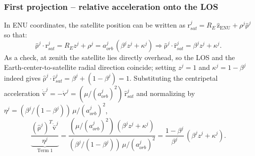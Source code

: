 \documentclass[letterpaper,times]{IONconf-v2}
\theoremstyle{plain}
\theoremstyle{remark}
\renewcommand{\vec}[1]{{\boldsymbol{\mathrm{#1}}}}
\begin{document}
\subsubsection{First projection -- relative acceleration onto the LOS}
In ENU coordinates, the satellite position can be written as $\vec r_{sat}^j = R_E\,\hat{\vec z}_{\mathrm{ENU}} + \rho^j\hat{\vec\rho}^j$ so that:
%
\begin{equation}\label{eq:rho_dot_rsat}
\hat{\vec\rho}^j\cdot\vec r_{sat}^j = R_E z^j + \rho^j = a_{orb}^j\,(\beta^j z^j + \kappa^j)\Rightarrow
\hat{\vec\rho}^j\cdot\hat{\vec r}_{sat}^j = \beta^j z^j + \kappa^j .
\end{equation}
%
As a check, at zenith the satellite lies directly overhead, so the LOS and the Earth-center-to-satellite radial direction coincide; setting $z^j=1$ and $\kappa^j=1-\beta^j$ indeed gives $\hat{\vec\rho}^j\cdot\hat{\vec r}_{sat}^j = \beta^j + (1-\beta^j) = 1$. Substituting the centripetal acceleration $\dot{\bar{\vec v}}^j = -\dot{\vec v}^j = (\mu/(a_{orb}^j)^2)\,\hat{\vec r}_{sat}^j$ and normalizing by $\eta^j = (\beta^j/(1-\beta^j))\,\mu/(a_{orb}^j)^2$,
%
\begin{equation}\label{eq:term1}
\underbrace{\frac{(\hat{\vec\rho}^j)^T\dot{\bar{\vec v}}^j}{\eta^j}}_{\text{Term 1}}
= \frac{(\mu/(a_{orb}^j)^2)\,(\beta^j z^j + \kappa^j)}{(\beta^j/(1-\beta^j))\,\mu/(a_{orb}^j)^2}
= \frac{1-\beta^j}{\beta^j}\,(\beta^j z^j + \kappa^j).
\end{equation}
%
\vspace{-10pt}
%
\end{document}

